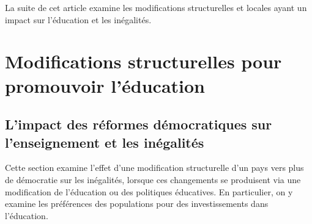 \documentclass[pagesize, twoside=off, bibliography=totoc, DIV=calc, fontsize=12pt, a4paper, french]{scrartcl}
\begin{document}
La suite de cet article examine les modifications structurelles et locales ayant un impact sur l’éducation et les inégalités.

\section{Modifications structurelles pour promouvoir l’éducation}

\label{sec_struc}

\subsection{L’impact des réformes démocratiques sur l’enseignement et les inégalités}

Cette section examine l’effet d’une modification structurelle d’un pays vers plus de démocratie sur les inégalités, lorsque ces changements se produisent via une modification de l’éducation ou des politiques éducatives. En particulier, on y examine les préférences des populations pour des investissements dans l’éducation.
\end{document}
